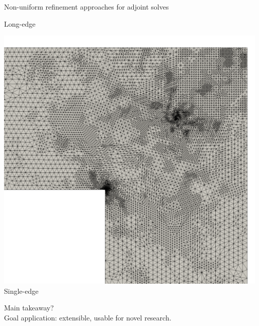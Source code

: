 \documentclass[fleqn]{beamer}
\begin{document}
\begin{frame}{Non-uniform refinement approaches for adjoint solves}
\begin{minipage}{0.33\textwidth}
Long-edge
\end{minipage}%
\begin{minipage}{0.33\textwidth}
\centering
\includegraphics[width=0.99\textwidth]{../img/refine_squarehole_long_close} \\
Single-edge
\end{minipage}

\vspace{1em}
Main takeaway? \\
Goal application: extensible, usable for novel research.
\end{frame}

\end{document}
